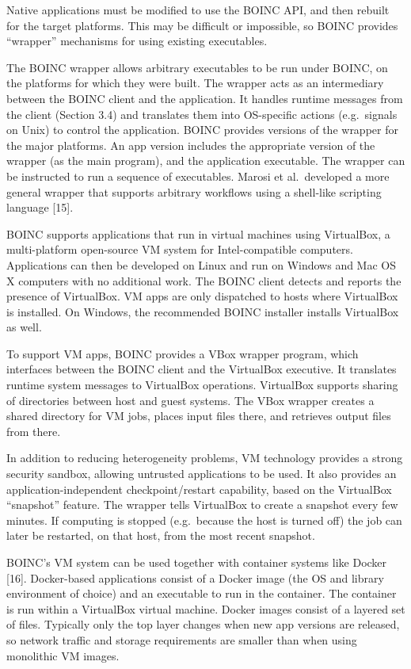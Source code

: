 \documentclass[
]{article}
\begin{document}
Native applications must be modified to use the BOINC API, and then
rebuilt for the target platforms. This may be difficult or impossible,
so BOINC provides ``wrapper'' mechanisms for using existing executables.

The BOINC wrapper allows arbitrary executables to be run under BOINC, on
the platforms for which they were built. The wrapper acts as an
intermediary between the BOINC client and the application. It handles
runtime messages from the client (Section 3.4) and translates them into
OS-specific actions (e.g.~signals on Unix) to control the application.
BOINC provides versions of the wrapper for the major platforms. An app
version includes the appropriate version of the wrapper (as the main
program), and the application executable. The wrapper can be instructed
to run a sequence of executables. Marosi et al.~developed a more general
wrapper that supports arbitrary workflows using a shell-like scripting
language {[}15{]}.

BOINC supports applications that run in virtual machines using
VirtualBox, a multi-platform open-source VM system for Intel-compatible
computers. Applications can then be developed on Linux and run on
Windows and Mac OS X computers with no additional work. The BOINC client
detects and reports the presence of VirtualBox. VM apps are only
dispatched to hosts where VirtualBox is installed. On Windows, the
recommended BOINC installer installs VirtualBox as well.

To support VM apps, BOINC provides a VBox wrapper program, which
interfaces between the BOINC client and the VirtualBox executive. It
translates runtime system messages to VirtualBox operations. VirtualBox
supports sharing of directories between host and guest systems. The VBox
wrapper creates a shared directory for VM jobs, places input files
there, and retrieves output files from there.

In addition to reducing heterogeneity problems, VM technology provides a
strong security sandbox, allowing untrusted applications to be used. It
also provides an application-independent checkpoint/restart capability,
based on the VirtualBox ``snapshot'' feature. The wrapper tells
VirtualBox to create a snapshot every few minutes. If computing is
stopped (e.g.~because the host is turned off) the job can later be
restarted, on that host, from the most recent snapshot.

BOINC's VM system can be used together with container systems like
Docker {[}16{]}. Docker-based applications consist of a Docker image
(the OS and library environment of choice) and an executable to run in
the container. The container is run within a VirtualBox virtual machine.
Docker images consist of a layered set of files. Typically only the top
layer changes when new app versions are released, so network traffic and
storage requirements are smaller than when using monolithic VM images.
\end{document}
